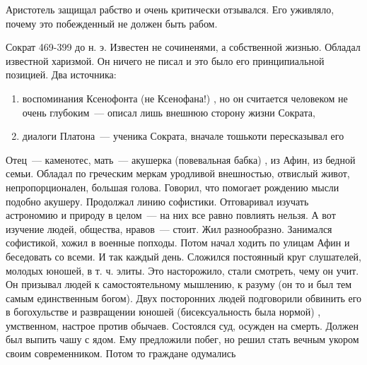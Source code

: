 Аристотель защищал рабство и очень критически отзывался. Его уживляло, почему это побежденный не должен быть рабом. 

Сократ
469-399 до н. э. 
Известен не сочиненями, а собственной жизнью. Обладал известной харизмой. Он ничего не писал и это было его принципиальной позицией. Два источника: 

\begin{enumerate}
	\item воспоминания Ксенофонта (не Ксенофана!) , но он считается человеком не очень глубоким~--- описал лишь внешнюю сторону жизни Сократа, 
	\item диалоги Платона~--- ученика Сократа, вначале тошькоти пересказывал его
\end{enumerate}

Отец~--- каменотес, мать~--- акушерка (повевальная бабка) , из Афин, из бедной семьи. Обладал по греческим меркам уродливой внешностью, отвислый живот, непропорционален, большая голова. 
Говорил, что помогает рождению мысли подобно акушеру. Продолжал линию софистики. Отговаривал изучать астрономию и природу в целом~--- на них все равно повлиять нельзя. А вот изучение людей, общества, нравов~--- стоит. 
Жил разнообразно. Занимался софистикой, хожил в военные попходы. Потом начал ходить по улицам Афин и беседовать со всеми. И так каждый день. 
Сложился постоянный круг слушателей, молодых юношей, в т. ч. элиты. Это насторожило, стали смотреть, чему он учит. 
Он призывал людей к самостоятельному мышлению, к разуму (он то и был тем самым единственным богом). 
Двух посторонних людей подговорили обвинить его в богохульстве и развращении юношей (бисексуальность была нормой) , умственном, настрое против обычаев. 
Состоялся суд, осужден на смерть. Должен был выпить чашу с ядом. Ему предложили побег, но решил стать вечным укором своим современником. Потом то граждане одумались
